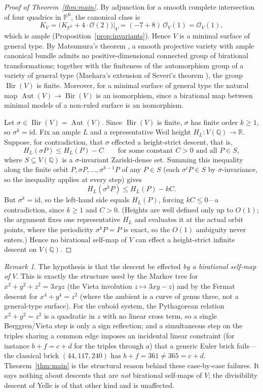 \documentclass[11pt,reqno]{amsart}
\theoremstyle{plain}
\theoremstyle{definition}
\theoremstyle{remark}
\newtheorem{remark}[theorem]{Remark}
\newcommand{\Q}{\mathbb{Q}}
\newcommand{\R}{\mathbb{R}}
\newcommand{\PP}{\mathbb{P}}
\newcommand{\Aut}{\operatorname{Aut}}
\newcommand{\Bir}{\operatorname{Bir}}
\begin{document}
\begin{proof}[Proof of Theorem~\ref{thm:main}]
By adjunction for a smooth complete intersection of four quadrics in $\PP^6$, the
canonical class is
\[
K_V=\bigl(K_{\PP^6}+4\cdot\mathcal{O}(2)\bigr)\big|_V=(-7+8)\,\mathcal{O}_V(1)
   =\mathcal{O}_V(1),
\]
which is ample (Proposition~\ref{prop:invariants}). Hence $V$ is a minimal surface
of general type. By Matsumura's theorem \cite{Matsumura}, a smooth projective variety
with ample canonical bundle admits no positive-dimensional connected group of
birational transformations; together with the finiteness of the automorphism group of
a variety of general type (Maehara's extension of Severi's theorem
\cite{Maehara,Iitaka}), the group $\Bir(V)$ is finite. Moreover, for a minimal surface
of general type the natural map $\Aut(V)\to\Bir(V)$ is an isomorphism, since a
birational map between minimal models of a non-ruled surface is an isomorphism.

Let $\sigma\in\Bir(V)=\Aut(V)$. Since $\Bir(V)$ is finite, $\sigma$ has finite order
$k\ge1$, so $\sigma^{k}=\mathrm{id}$. Fix an ample $L$ and a representative Weil height
$H_L\colon V(\Q)\to\R$. Suppose, for contradiction, that $\sigma$ effected a
height-strict descent, that is,
\[
H_L(\sigma P)\le H_L(P)-C\qquad\text{for some constant }C>0\text{ and all }P\in S,
\]
where $S\subseteq V(\Q)$ is a $\sigma$-invariant Zariski-dense set. Summing this
inequality along the finite orbit $P,\sigma P,\dots,\sigma^{k-1}P$ of any $P\in S$ (each
$\sigma^{i}P\in S$ by $\sigma$-invariance, so the inequality applies at every step) gives
\[
H_L(\sigma^{k}P)\le H_L(P)-kC .
\]
But $\sigma^{k}=\mathrm{id}$, so the left-hand side equals $H_L(P)$, forcing $kC\le0$---a
contradiction, since $k\ge1$ and $C>0$. (Heights are well defined only up to $O(1)$; the
argument fixes one representative $H_L$ and evaluates it at the actual orbit points, where
the periodicity $\sigma^{k}P=P$ is exact, so the $O(1)$ ambiguity never enters.) Hence no
birational self-map of $V$ can effect a height-strict infinite descent on $V(\Q)$.
\end{proof}

\begin{remark}\label{rem:yelle}
The hypothesis is that the descent be effected \emph{by a birational self-map of}
$V$. This is exactly the structure used by the Markov tree for
$x^2+y^2+z^2=3xyz$ (the Vieta involution $z\mapsto 3xy-z$) and by the Fermat descent
for $x^4+y^4=z^2$ (where the ambient is a curve of genus three, not a general-type
surface). For the cuboid system, the Pythagorean relation $x^2+y^2=z^2$ is a
quadratic in $z$ with no linear cross term, so a single Berggren/Vieta step is only a
sign reflection; and a simultaneous step on the triples sharing a common edge imposes
an incidental linear constraint (for instance $b+f=c+d$ for the triples through $a$)
that a generic Euler brick fails---the classical brick $(44,117,240)$ has
$b+f=361\ne 365=c+d$. Theorem~\ref{thm:main} is the structural reason behind these
case-by-case failures. It says nothing about descents that are \emph{not}
birational self-maps of $V$; the divisibility descent of Yelle \cite{Yelle} is of that
other kind and is unaffected.
\end{remark}
\end{document}
